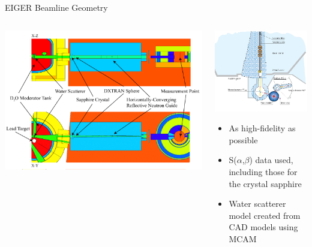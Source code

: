 \documentclass[final,t]{beamer}
\begin{document}
\begin{frame}{}
\begin{columns}[t]
\begin{column}{.3\linewidth}
\begin{block}{EIGER Beamline Geometry}
\begin{columns}[T]
\begin{column}{.75\linewidth}
        \includegraphics*[width=\linewidth]{geom.pdf}
        
        \end{column}
          \begin{column}{.25\linewidth}

          \begin{center}
          \includegraphics*[width=\linewidth]{eiger_lr.png}
          \end{center}

          \begin{itemize} 
          \item As high-fidelity as possible
          \item S($\alpha$,$\beta$) data used, including those for the crystal sapphire \cite{sapp}
          \item Water scatterer model created from CAD models using MCAM \cite{mcam}
          \end{itemize}


\end{column}
\end{columns}
\end{block}
\end{column}
\end{columns}
\end{frame}
\end{document}
